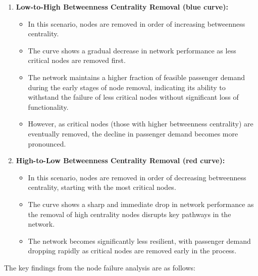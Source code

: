 \documentclass[
  letterpaper,
  DIV=11,
  numbers=noendperiod]{scrartcl}
\providecommand{\tightlist}{%
  \setlength{\itemsep}{0pt}\setlength{\parskip}{0pt}}\usepackage{longtable,booktabs,array}
\begin{document}
\begin{enumerate}
\def\labelenumi{\arabic{enumi}.}
\item
  \textbf{Low-to-High Betweenness Centrality Removal (blue curve):}

  \begin{itemize}
  \tightlist
  \item
    In this scenario, nodes are removed in order of increasing
    betweenness centrality.
  \item
    The curve shows a gradual decrease in network performance as less
    critical nodes are removed first.
  \item
    The network maintains a higher fraction of feasible passenger demand
    during the early stages of node removal, indicating its ability to
    withstand the failure of less critical nodes without significant
    loss of functionality.
  \item
    However, as critical nodes (those with higher betweenness
    centrality) are eventually removed, the decline in passenger demand
    becomes more pronounced.
  \end{itemize}
\item
  \textbf{High-to-Low Betweenness Centrality Removal (red curve):}

  \begin{itemize}
  \tightlist
  \item
    In this scenario, nodes are removed in order of decreasing
    betweenness centrality, starting with the most critical nodes.
  \item
    The curve shows a sharp and immediate drop in network performance as
    the removal of high centrality nodes disrupts key pathways in the
    network.
  \item
    The network becomes significantly less resilient, with passenger
    demand dropping rapidly as critical nodes are removed early in the
    process.
  \end{itemize}
\end{enumerate}

The key findings from the node failure analysis are as follows:
\end{document}
